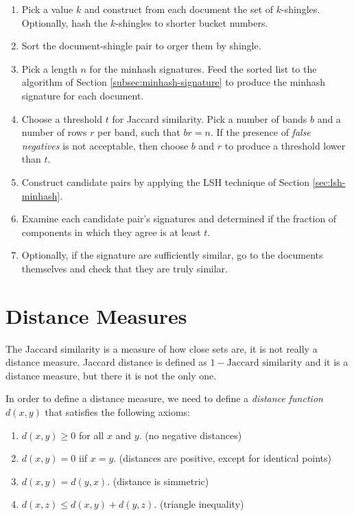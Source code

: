 \begin{enumerate}
    \item Pick a value $k$ and construct from each document the set of $k$-shingles. Optionally, hash the $k$-shingles to shorter bucket numbers.
    \item Sort the document-shingle pair to orger them by shingle.
    \item Pick a length $n$ for the minhash signatures. Feed the sorted list to the algorithm of Section \ref{subsec:minhash-signature} to produce the minhash signature for each document.
    \item Choose a threshold $t$ for Jaccard similarity. Pick a number of bands $b$ and a number of rows $r$ per band, such that $br = n$. If the presence of \textit{false negatives} is not acceptable, then choose $b$ and $r$ to produce a threshold lower than $t$.
    \item Construct candidate pairs by applying the LSH technique of Section \ref{sec:lsh-minhash}.
    \item Examine each candidate pair's signatures and determined if the fraction of components in which they agree is at least $t$.
    \item Optionally, if the signature are sufficiently similar, go to the documents themselves and check that they are truly similar.
\end{enumerate}

\section{Distance Measures}\label{sec:distance-measures}

The Jaccard similarity is a measure of how close sets are, it is not really a distance measure. Jaccard distance is defined as $1 - \text{Jaccard similarity}$ and it is a distance measure, but there it is not the only one.

In order to define a distance measure, we need to define a \textit{distance function} $d(x, y)$ that satisfies the following axioms:

\begin{enumerate}
    \item $d(x, y) \geq 0$ for all $x$ and $y$. (no negative distances)
    \item $d(x, y) = 0$ iif $x = y$. (distances are positive, except for identical points)
    \item $d(x, y) = d(y, x)$. (distance is simmetric)
    \item $d(x, z) \leq d(x, y) + d(y, z)$. (triangle inequality)
\end{enumerate}

